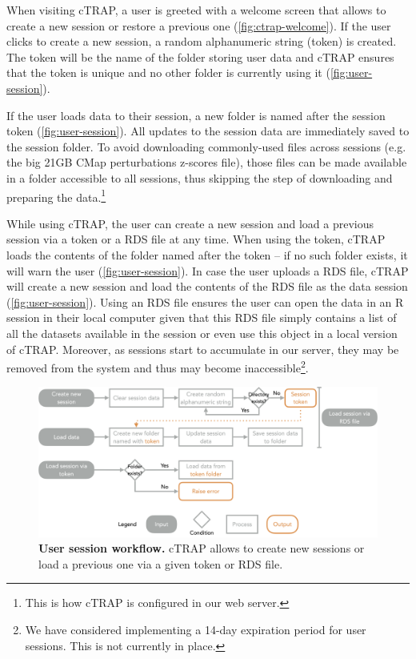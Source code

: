 When visiting cTRAP, a user is greeted with a welcome screen that allows to create a new session or restore a previous one (\autoref{fig:ctrap-welcome}). If the user clicks to create a new session, a random alphanumeric string (token) is created. The token will be the name of the folder storing user data and cTRAP ensures that the token is unique and no other folder is currently using it (\autoref{fig:user-session}).

If the user loads data to their session, a new folder is named after the session token (\autoref{fig:user-session}). All updates to the session data are immediately saved to the session folder. To avoid downloading commonly-used files across sessions (e.g. the big 21GB CMap perturbations z-scores file), those files can be made available in a folder accessible to all sessions, thus skipping the step of downloading and preparing the data.\footnote{This is how cTRAP is configured in our web server.}

While using cTRAP, the user can create a new session and load a previous session via a token or a RDS file at any time. When using the token, cTRAP loads the contents of the folder named after the token – if no such folder exists, it will warn the user (\autoref{fig:user-session}). In case the user uploads a RDS file, cTRAP will create a new session and load the contents of the RDS file as the data session (\autoref{fig:user-session}). Using an RDS file ensures the user can open the data in an R session in their local computer given that this RDS file simply contains a list of all the datasets available in the session or even use this object in a local version of cTRAP. Moreover, as sessions start to accumulate in our server, they may be removed from the system and thus may become inaccessible\footnote{We have considered implementing a 14-day expiration period for user sessions. This is not currently in place.}.

\begin{figure}[!ht]
  \includegraphics[width=\textwidth]{images/ctrap/user-session}
  \centering
  \caption[User session workflow]{\textbf{User session workflow.} cTRAP allows to create new sessions or load a previous one via a given token or RDS file.}
  \label{fig:user-session}
\end{figure}


